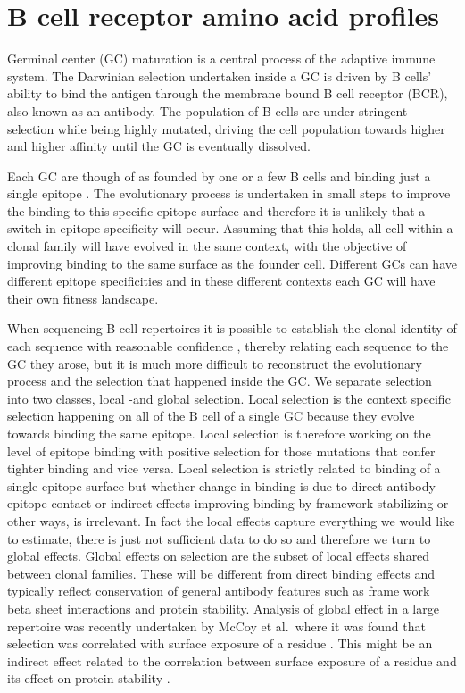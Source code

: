 
\iffalse




\chapter{B cell receptor amino acid profiles}

Germinal center (GC) maturation is a central process of the adaptive immune system.
The Darwinian selection undertaken inside a GC is driven by B cells' ability to bind the antigen through the membrane bound B cell receptor (BCR), also known as an antibody.
The population of B cells are under stringent selection while being highly mutated, driving the cell population towards higher and higher affinity until the GC is eventually dissolved.

Each GC are though of as founded by one or a few B cells and binding just a single epitope \cite{tas2016visualizing}.
The evolutionary process is undertaken in small steps to improve the binding to this specific epitope surface and therefore it is unlikely that a switch in epitope specificity will occur.
Assuming that this holds, all cell within a clonal family will have evolved in the same context, with the objective of improving binding to the same surface as the founder cell.
Different GCs can have different epitope specificities and in these different contexts each GC will have their own fitness landscape.

When sequencing B cell repertoires it is possible to establish the clonal identity of each sequence with reasonable confidence \cite{ralph2016likelihood}, thereby relating each sequence to the GC they arose, but it is much more difficult to reconstruct the evolutionary process and the selection that happened inside the GC.
We separate selection into two classes, local -and global selection.
Local selection is the context specific selection happening on all of the B cell of a single GC because they evolve towards binding the same epitope.
Local selection is therefore working on the level of epitope binding with positive selection for those mutations that confer tighter binding and vice versa.
Local selection is strictly related to binding of a single epitope surface but whether change in binding is due to direct antibody epitope contact or indirect effects improving binding by framework stabilizing or other ways, is irrelevant.
In fact the local effects capture everything we would like to estimate, there is just not sufficient data to do so and therefore we turn to global effects.
Global effects on selection are the subset of local effects shared between clonal families.
These will be different from direct binding effects and typically reflect conservation of general antibody features such as frame work beta sheet interactions and protein stability.
Analysis of global effect in a large repertoire was recently undertaken by McCoy et al.\ where it was found that selection was correlated with surface exposure of a residue \cite{mccoy2015quantifying}.
This might be an indirect effect related to the correlation between surface exposure of a residue and its effect on protein stability \cite{echave2016causes}.

